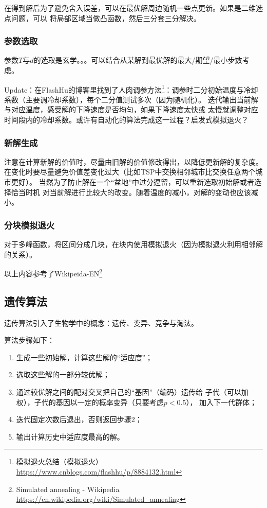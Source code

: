 在得到解后为了避免舍入误差，可以在最优解周边随机一些点更新。如果是二维选点问题，可以
将局部区域当做凸函数，然后三分套三分解决。
\subsubsection{参数选取}
参数$T$与$d$的选取是玄学。。。可以结合从某解到最优解的最大/期望/最小步数考虑。

Update：在FlashHu的博客里找到了人肉调参方法\footnote{
	模拟退火总结（模拟退火）\\
	\url{https://www.cnblogs.com/flashhu/p/8884132.html}
}：调参时二分初始温度与冷却系数（主要调冷却系数），每个二分值测试多次（因为随机化）。
迭代输出当前解与对应温度，感受解的下降速度是否均匀，如果下降速度太快或
太慢就调整对应时间段内的冷却系数。或许有自动化的算法完成这一过程？启发式模拟退火？

\subsubsection{新解生成}
注意在计算新解的价值时，尽量由旧解的价值修改得出，以降低更新解的复杂度。
在变化时要尽量避免价值差变化过大（比如TSP中交换相邻城市比交换任意两个城市更好）。
当然为了防止解在一个``盆地''中过分逗留，可以重新选取初始解或者选择恰当时机
对当前解进行比较大的改变。随着温度的减小，对解的变动也应该减小。
\subsubsection{分块模拟退火}
对于多峰函数，将区间分成几块，在块内使用模拟退火（因为模拟退火利用相邻解的关系）。

以上内容参考了Wikipeida-EN\footnote{
	Simulated annealing - Wikipedia\\
	\url{https://en.wikipedia.org/wiki/Simulated\_annealing}
}
\subsection{遗传算法}
遗传算法引入了生物学中的概念：遗传、变异、竞争与淘汰。

算法步骤如下：
\begin{enumerate}
	\item 生成一些初始解，计算这些解的``适应度''；
	\item 选取这些解的一部分较优解；
	\item 通过较优解之间的配对交叉把自己的``基因''（编码）遗传给
		  子代（可以加权），子代的基因以一定的概率变异（只要考虑$p<0.5$），
		  加入下一代群体；
	\item 迭代固定次数后退出，否则返回步骤2；
	\item 输出计算历史中适应度最高的解。
\end{enumerate}
